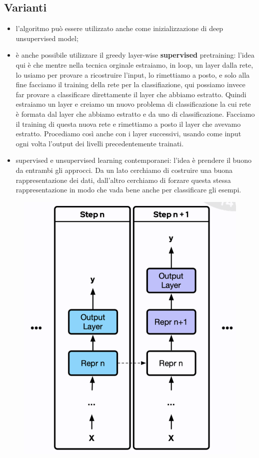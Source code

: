 \subsection{Varianti}
\begin{itemize}
  \item l'algoritmo può essere utilizzato anche come inizializzazione di deep unsupervised model;
  \item è anche possibile utilizzare il greedy layer-wise \textbf{supervised} pretraining: l'idea qui è che
  mentre nella tecnica orginale estraiamo, in loop, un layer dalla rete, lo usiamo per provare a 
  ricostruire l'input, lo rimettiamo a posto, e solo alla fine facciamo il training della rete per la 
  classifiazione, qui possiamo invece far provare a classificare direttamente il layer che abbiamo estratto.
  Quindi estraiamo un layer e creiamo un nuovo problema di classificazione la cui rete è formata dal layer 
  che abbiamo estratto e da uno di classificazione. Facciamo il training di questa nuova rete e rimettiamo a 
  posto il layer che avevamo estratto. Procediamo così anche con i layer successivi, usando come input ogni
  volta l'output dei livelli precedentemente trainati.

  \item supervised e unsupervised learning contemporanei: l'idea è prendere il buono da entrambi gli approcci.
  Da un lato cerchiamo di costruire una buona rappresentazione dei dati, dall'altro cerchiamo di forzare 
  questa stessa rappresentazione in modo che vada bene anche per classificare gli esempi.
\end{itemize}

\begin{figure}[!h]
  \includegraphics[scale=.4]{images/representation_learning/varianti.png}
  \centering
\end{figure}

